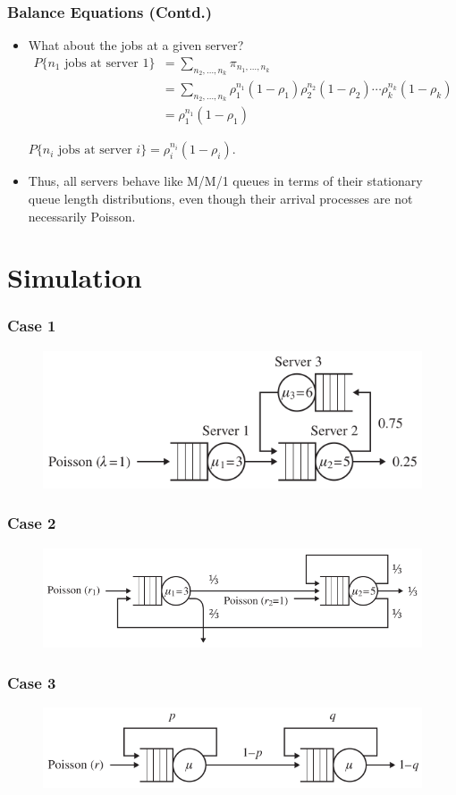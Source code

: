 \documentclass[10pt,notes]{beamer}
\begin{document}
\begin{frame}
    \frametitle{Balance Equations (Contd.)}
    \begin{itemize}
        \item What about the jobs at a given server?
            \begin{align*}
                P\{n_1 \text{ jobs at server } 1\} &= \sum_{n_2,\ldots,n_k} \pi_{n_1,\ldots,n_k} \\
                &= \sum_{n_2,\ldots,n_k} \rho_1^{n_1} (1 - \rho_1) \rho_2^{n_2} (1 - \rho_2) \cdots \rho_k^{n_k} (1 - \rho_k) \\
                &= \rho_1^{n_1} (1 - \rho_1)
            \end{align*}
        
        \begin{tcolorbox}
            \centering $P\{n_i \text{ jobs at server } i\} = \rho_i^{n_i} (1 - \rho_i).$
        \end{tcolorbox}
        \item Thus, all servers behave like M/M/1 queues in terms of their stationary queue length distributions, even though their arrival processes are not necessarily Poisson.
    \end{itemize}
\end{frame}

\section{Simulation}

\begin{frame}
    \frametitle{Case 1}
    \begin{figure}
        \includegraphics[width=0.6\linewidth]{images/case1.png}
    \end{figure}
\end{frame}

\begin{frame}
    \frametitle{Case 2}
    \begin{figure}
        \includegraphics[width=0.6\linewidth]{images/case2.png}
    \end{figure}
\end{frame}

\begin{frame}
    \frametitle{Case 3}
    \begin{figure}
        \includegraphics[width=0.6\linewidth]{images/case3.png}
    \end{figure}
\end{frame}
\end{document}
